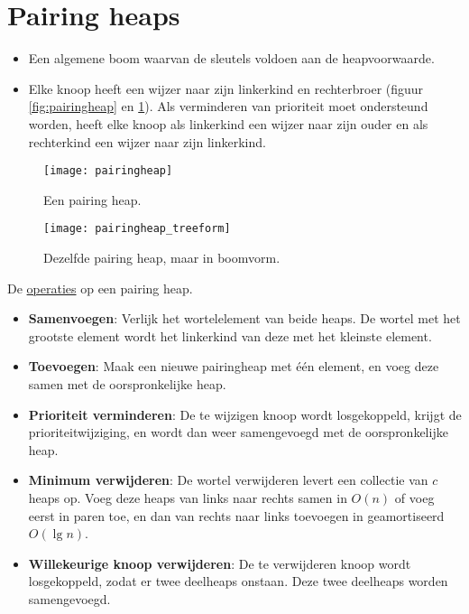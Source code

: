 \section{Pairing heaps}
		\begin{itemize}
			\item Een algemene boom waarvan de sleutels voldoen aan de heapvoorwaarde.
			\item Elke knoop heeft een wijzer naar zijn linkerkind en rechterbroer (figuur \ref{fig:pairingheap} en \ref{fig:pairingheap_treeform}). Als verminderen van prioriteit moet ondersteund worden, heeft elke knoop als linkerkind een wijzer naar zijn ouder en als rechterkind een wijzer naar zijn linkerkind.
		\end{itemize}
		\begin{figure}[ht]
			\centering
			\begin{minipage}{.49\textwidth}
				\centering
				\texttt{[image: pairingheap]}
				\caption{Een pairing heap.}
				\label{fig:pairingheap}
			\end{minipage}
			\begin{minipage}{.49\textwidth}
				\centering
				\texttt{[image: pairingheap\_treeform]}
				\caption{Dezelfde pairing heap, maar in boomvorm.}
				\label{fig:pairingheap_treeform}
			\end{minipage}%
		\end{figure}

		De \underline{operaties} op een pairing heap.
		\begin{itemize}
			\item \textbf{Samenvoegen}: Verlijk het wortelelement van beide heaps. De wortel met het grootste element wordt het linkerkind van deze met het kleinste element.
			\item \textbf{Toevoegen}: Maak een nieuwe pairingheap met één element, en voeg deze samen met de oorspronkelijke heap.
			\item \textbf{Prioriteit verminderen}: De te wijzigen knoop wordt losgekoppeld, krijgt de prioriteitwijziging, en wordt dan weer samengevoegd met de oorspronkelijke heap.
			\item \textbf{Minimum verwijderen}: De wortel verwijderen levert een collectie van $c$ heaps op. Voeg deze heaps van links naar rechts samen in $O(n)$ of voeg eerst in paren toe, en dan van rechts naar links toevoegen in geamortiseerd $O(\lg n)$.
			\item \textbf{Willekeurige knoop verwijderen}: De te verwijderen knoop wordt losgekoppeld, zodat er twee deelheaps onstaan. Deze twee deelheaps worden samengevoegd.
		\end{itemize}
